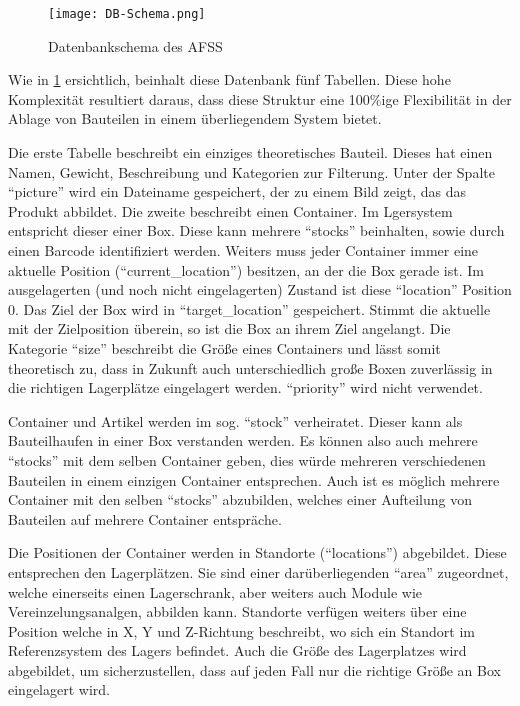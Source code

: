 \begin{figure}[h]
    \texttt{[image: DB-Schema.png]}
    \centering
    \caption{Datenbankschema des AFSS}
    \label{DB-Scema}
\end{figure}

Wie in \ref{DB-Scema} ersichtlich, beinhalt diese Datenbank fünf Tabellen. Diese hohe Komplexität resultiert daraus, dass diese Struktur eine 100\%ige Flexibilität in der Ablage von Bauteilen in einem überliegendem System bietet.

Die erste Tabelle beschreibt ein einziges theoretisches Bauteil. Dieses hat einen Namen, Gewicht, Beschreibung und Kategorien zur Filterung. Unter der Spalte \enquote{picture} wird ein Dateiname gespeichert, der zu einem Bild zeigt, das das Produkt abbildet.
Die zweite beschreibt einen Container. Im Lgersystem entspricht dieser einer Box. Diese kann mehrere \enquote{stocks} beinhalten, sowie durch einen Barcode identifiziert werden. Weiters muss jeder Container immer eine aktuelle Position (\enquote{current\_location}) besitzen, an der die Box gerade ist. Im ausgelagerten (und noch nicht eingelagerten) Zustand ist diese \enquote{location} Position 0. Das Ziel der Box wird in \enquote{target\_location} gespeichert. Stimmt die aktuelle mit der Zielposition überein, so ist die Box an ihrem Ziel angelangt. Die Kategorie \enquote{size} beschreibt die Größe eines Containers und lässt somit theoretisch zu, dass in Zukunft auch unterschiedlich große Boxen zuverlässig in die richtigen Lagerplätze eingelagert werden. \enquote{priority} wird nicht verwendet.

Container und Artikel werden im sog. \enquote{stock} verheiratet. Dieser kann als Bauteilhaufen in einer Box verstanden werden. Es können also auch mehrere \enquote{stocks} mit dem selben Container geben, dies würde mehreren verschiedenen Bauteilen in einem einzigen Container entsprechen. Auch ist es möglich mehrere Container mit den selben \enquote{stocks} abzubilden, welches einer Aufteilung von Bauteilen auf mehrere Container entspräche.

Die Positionen der Container werden in Standorte (\enquote{locations}) abgebildet. Diese entsprechen den Lagerplätzen. Sie sind einer darüberliegenden \enquote{area} zugeordnet, welche einerseits einen Lagerschrank, aber weiters auch Module wie Vereinzelungsanalgen, abbilden kann. Standorte verfügen weiters über eine Position welche in X, Y und Z-Richtung beschreibt, wo sich ein Standort im Referenzsystem des Lagers befindet. Auch die Größe des Lagerplatzes wird abgebildet, um sicherzustellen, dass auf jeden Fall nur die richtige Größe an Box eingelagert wird.


